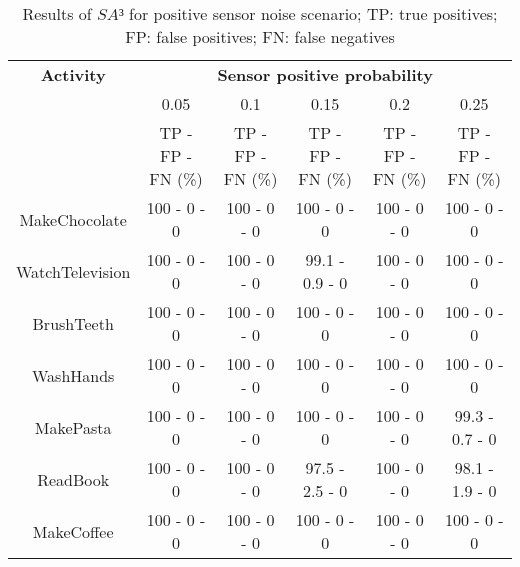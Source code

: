 \begin{table}[htbp]\scriptsize
    \begin{center}    
        \begin{tabular}{cccccc}
            \hline            
            \textbf{Activity} & \multicolumn{5}{c}{\textbf{Sensor positive probability}}\\
             & 0.05 & 0.1 & 0.15 & 0.2 & 0.25 \\
             & TP - FP - FN (\%) & TP - FP - FN (\%) & TP - FP - FN (\%) & TP - FP - FN (\%) & TP - FP - FN (\%)\\
            \hline
            MakeChocolate   & 100 - 0 - 0 & 100 - 0 - 0 & 100 - 0 - 0     & 100 - 0 - 0 & 100 - 0 - 0 \\
	    WatchTelevision & 100 - 0 - 0 & 100 - 0 - 0 & 99.1 - 0.9 - 0  & 100 - 0 - 0 & 100 - 0 - 0 \\
	    BrushTeeth      & 100 - 0 - 0 & 100 - 0 - 0 & 100 - 0 - 0     & 100 - 0 - 0 & 100 - 0 - 0 \\
	    WashHands       & 100 - 0 - 0 & 100 - 0 - 0 & 100 - 0 - 0     & 100 - 0 - 0 & 100 - 0 - 0 \\
	    MakePasta       & 100 - 0 - 0 & 100 - 0 - 0 & 100 - 0 - 0     & 100 - 0 - 0 & 99.3 - 0.7 - 0 \\
	    ReadBook        & 100 - 0 - 0 & 100 - 0 - 0 & 97.5 - 2.5 - 0  & 100 - 0 - 0 & 98.1 - 1.9 - 0 \\
	    MakeCoffee      & 100 - 0 - 0 & 100 - 0 - 0 & 100 - 0 - 0     & 100 - 0 - 0 & 100 - 0 - 0 \\
            \hline
        \end{tabular}          
        \caption{Results of $SA³$ for positive sensor noise scenario; TP: true positives; FP: false positives; FN: false negatives}
        \label{tab-sa3-positive}
    \end{center}
\end{table}

